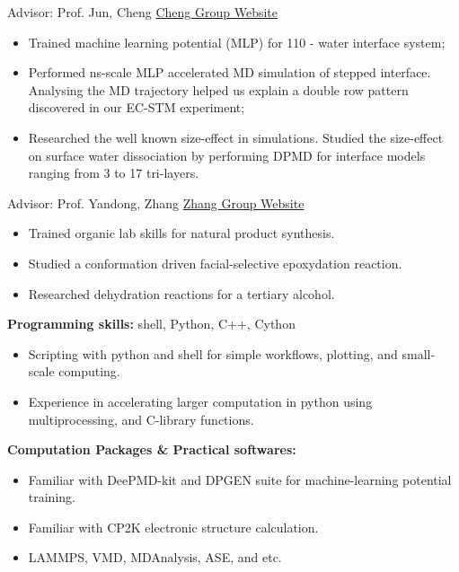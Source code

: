 

{\noindent Advisor: Prof. Jun, Cheng  \hfill \href{https://chengjun.xmu.edu.cn/}{Cheng Group Website}}


\begin{itemize}
    \item Trained machine learning potential (MLP) for  110 - water interface system;
    \item Performed ns-scale MLP accelerated MD simulation of stepped  interface. Analysing the MD trajectory helped us explain a double row pattern discovered in our EC-STM experiment;
    \item Researched the well known size-effect in  simulations. Studied the size-effect on surface water dissociation by performing DPMD for interface models ranging from 3 to 17  tri-layers. 
\end{itemize}



{\noindent Advisor: Prof. Yandong, Zhang  \hfill \href{https://zhanglab.xmu.edu.cn/}{Zhang Group Website}}

\begin{itemize}
    \item Trained organic lab skills for natural product synthesis.
    \item Studied a conformation driven facial-selective epoxydation reaction.
    \item Researched dehydration reactions for a tertiary alcohol.
\end{itemize}


\vspace{5mm}

\sectionrule
{\noindent \textbf{Programming skills:} }{shell, Python, C++, Cython}
\begin{itemize}
    \item Scripting with python and shell for simple workflows, plotting, and small-scale computing.
    \item Experience in accelerating larger computation in python using multiprocessing, and C-library functions. 
\end{itemize}

{\noindent \textbf{Computation Packages \& Practical softwares:} }

\begin{itemize}
    \item Familiar with DeePMD-kit and DPGEN suite for machine-learning potential training.
    \item Familiar with CP2K electronic structure calculation.
    \item LAMMPS, VMD, MDAnalysis, ASE, and etc.
\end{itemize}

